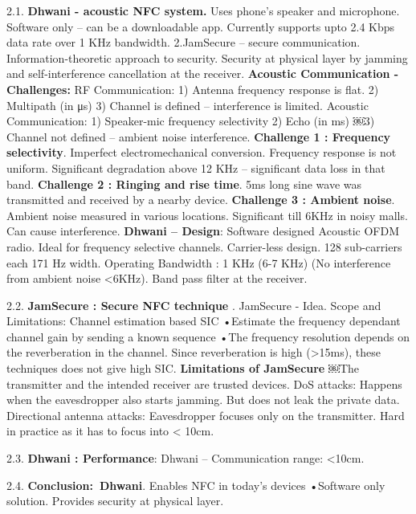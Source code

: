 \documentclass[8pt]{extarticle}
\begin{document}
\begin{multicols}{2}
2.1. \textbf{Dhwani - acoustic NFC system.} Uses phone’s speaker and microphone. Software only – can be a downloadable app. Currently supports upto 2.4 Kbps data rate over 1 KHz bandwidth. 2.JamSecure – secure communication. Information-theoretic approach to security. Security at physical layer by jamming and self-interference cancellation at the receiver. \textbf{Acoustic Communication - Challenges:} RF Communication: 1) Antenna frequency response is flat. 2) Multipath (in μs) 3) Channel is defined – interference is limited. Acoustic Communication: 1) Speaker-mic frequency selectivity 2) Echo (in ms) ￼3) Channel not defined – ambient noise interference. \textbf{Challenge 1 : Frequency selectivity}. Imperfect electromechanical conversion. Frequency response is not uniform. Significant degradation above 12 KHz – significant data loss in that band. \textbf{Challenge 2 : Ringing and rise time}. 5ms long sine wave was transmitted and received by a nearby device. \textbf{Challenge 3 : Ambient noise}. Ambient noise measured in various locations. Significant till 6KHz in noisy malls. Can cause interference. \textbf{Dhwani – Design}: Software designed Acoustic OFDM radio. Ideal for frequency selective channels. Carrier-less design. 128 sub-carriers each 171 Hz width. Operating Bandwidth : 1 KHz (6-7 KHz) (No interference from ambient noise <6KHz). Band pass filter at the receiver.

2.2. \textbf{JamSecure : Secure NFC technique} . JamSecure - Idea. Scope and Limitations: Channel estimation based SIC
•Estimate the frequency dependant channel gain by sending a known sequence
•The frequency resolution depends on the reverberation in the channel. Since reverberation is high (>15ms), these techniques does not give high SIC. \textbf{Limitations of JamSecure} ￼The transmitter and the intended receiver are trusted devices.
DoS attacks: Happens when the eavesdropper also starts jamming. But does not leak the private data. Directional antenna attacks: Eavesdropper focuses only on the transmitter. Hard in practice as it has to focus into < 10cm.

2.3. \textbf{Dhwani : Performance}: Dhwani – Communication range:  <10cm. 

2.4. \textbf{Conclusion:\ Dhwani}. Enables NFC in today’s devices •Software only solution. Provides security at physical layer.


\end{multicols}
\end{document}
